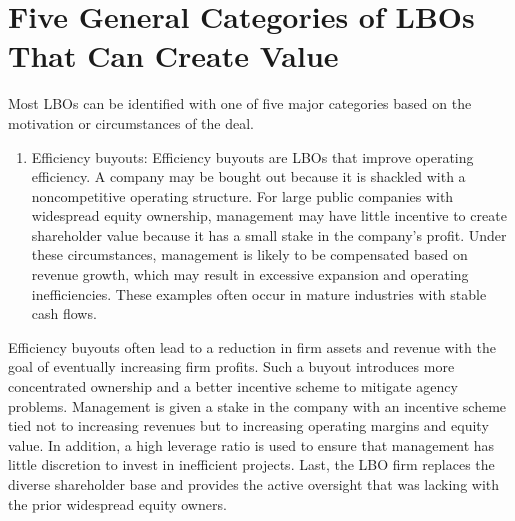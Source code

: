 \documentclass[11pt]{article}
\begin{document}
\section*{Five General Categories of LBOs That Can Create Value}
Most LBOs can be identified with one of five major categories based on the motivation or circumstances of the deal.

\begin{enumerate}
  \item Efficiency buyouts: Efficiency buyouts are LBOs that improve operating efficiency. A company may be bought out because it is shackled with a noncompetitive operating structure. For large public companies with widespread equity ownership, management may have little incentive to create shareholder value because it has a small stake in the company's profit. Under these circumstances, management is likely to be compensated based on revenue growth, which may result in excessive expansion and operating inefficiencies. These examples often occur in mature industries with stable cash flows.
\end{enumerate}

Efficiency buyouts often lead to a reduction in firm assets and revenue with the goal of eventually increasing firm profits. Such a buyout introduces more concentrated ownership and a better incentive scheme to mitigate agency problems. Management is given a stake in the company with an incentive scheme tied not to increasing revenues but to increasing operating margins and equity value. In addition, a high leverage ratio is used to ensure that management has little discretion to invest in inefficient projects. Last, the LBO firm replaces the diverse shareholder base and provides the active oversight that was lacking with the prior widespread equity owners.
\end{document}
